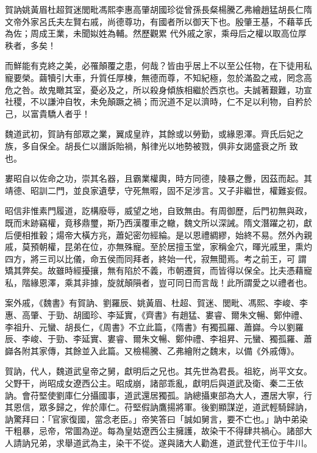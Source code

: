 
\begin{pinyinscope}

 賀訥姚黃眉杜超賀迷閭毗馮熙李惠高肇胡國珍從曾孫長粲楊騰乙弗繪趙猛胡長仁隋文帝外家呂氏夫左賢右戚，尚德尊功，有國者所以御天下也。殷肇王基，不藉莘氏為佐；周成王業，未聞姒姓為輔。然歷觀累
 代外戚之家，乘母后之權以取高位厚秩者，多矣！



 而鮮能有克終之美，必罹顛覆之患，何哉？皆由乎居上不以至公任物，在下徒用私寵要榮。繭犢引大車，升質任厚棟，無德而尊，不知紀極，忽於滿盈之戒，罔念高危之咎。故鬼瞰其室，憂必及之，所以殺身傾族相繼於西京也。夫誠著艱難，功宣社稷，不以謙沖自牧，未免顛蹶之禍；而況道不足以濟時，仁不足以利物，自矜於己，以富貴驕人者乎！



 魏道武初，賀訥有部眾之業，翼成皇祚，其餘或以勞勤，或緣恩澤。齊氏后妃之族，多自保全。胡長仁以譖訴貽禍，斛律光以地勢被戮，俱非女謁盛衰之所
 致也。



 婁昭自以佐命之功，崇其名器，且霸業權輿，時方同德，陵暴之釁，因茲而起。其靖德、昭訓二門，並良家遺孽，守死無暇，固不足涉言。又子非繼世，權難妄假。



 昭信非惟素門履道，訖構廢辱，威望之地，自致無由。有周御歷，后門初無與政，既而末跡竊權，竟移鼎璽，斯乃西漢覆車之轍，魏文所以深誡。隋文潛躍之初，獻后便相推轂；煬帝大橫方兆，蕭妃密勿經綸。是以恩禮綢繆，始終不易。然外內親戚，莫預朝權，昆弟在位，亦無殊寵。至於居擅玉堂，家稱金穴，暉光戚里，熏灼四方，將三司以比儀，命五侯而同拜者，終始一代，寂無聞焉。考之前王，可
 謂矯其弊矣。故雖時經擾攘，無有陷於不義，市朝遷貿，而皆得以保全。比夫憑藉寵私，階緣恩澤，乘其非據，旋就顛隕者，豈可同日而言哉！此所謂愛之以禮者也。



 案外戚，《魏書》有賀訥、劉羅辰、姚黃眉、杜超、賀迷、閭毗、馮熙、李峻、李惠、高肇、于勁、胡國珍、李延實，《齊書》有趙猛、婁睿、爾朱文暢、鄭仲禮、李祖升、元蠻、胡長仁，《周書》不立此篇，《隋書》有獨孤羅、蕭巋。今以劉羅辰、李峻、于勁、李延實、婁睿、爾朱文暢、鄭仲禮、李祖昇、元蠻、獨孤羅、蕭巋各附其家傳，其餘並入此篇。又檢楊騰、乙弗繪附之魏末，以備《外戚傳》。



 賀訥，代人，魏道武皇帝之舅，獻明后之兄也。其先世為君長。祖紇，尚平文女。父野干，尚昭成女遼西公主。昭成崩，諸部乖亂，獻明后與道武及衛、秦二王依訥。會苻堅使劉庫仁分攝國事，道武還居獨孤。訥總攝東部為大人，遷居大寧，行其恩信，眾多歸之，侔於庫仁。苻堅假訥鷹揚將軍。後劉顯謀逆，道武輕騎歸訥，訥驚拜曰：「官家復國，當念老臣。」帝笑答曰「誠如舅言，要不亡也。」訥中弟染干粗暴，忌帝，常圖為逆。每為皇姑遼西公主擁護，故染干不得肆共禍心。諸部大人請訥兄弟，求舉道武為主，染干不從。遂與諸大人勸進，道武登代王位于牛川。




\end{pinyinscope}
